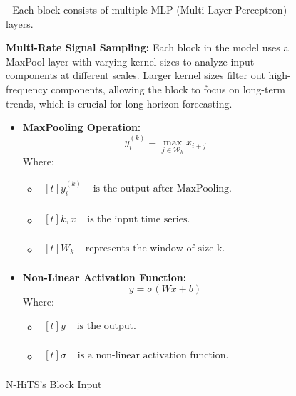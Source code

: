 \documentclass{ieeeojies}
\begin{document}
\begin{figure}[H]
\begin{minipage}{0.15\textwidth}
    \caption{N-HiTS’s Block Input}
    \label{fig:1}
    \end{minipage}
    \begin{minipage}{0.50\textwidth}
    - Each block consists of multiple MLP (Multi-Layer Perceptron) layers. \par
    \textbf{Multi-Rate Signal Sampling:} Each block in the model uses a MaxPool layer with varying kernel sizes to analyze input components at different scales. Larger kernel sizes filter out high-frequency components, allowing the block to focus on long-term trends, which is crucial for long-horizon forecasting.
\begin{itemize}
    \item  \textbf{MaxPooling Operation:} 
\[
y_i^{(k)} = \max_{j \in \mathcal{W}_k} x_{i+j}
\]
Where:
\begin{itemize}
    \item $\begin{aligned}[t]
            y_i^{(k)} & \text{ is the output after MaxPooling.} \\
            \end{aligned}$
    \item $\begin{aligned}[t]
            k, x & \text{ is the input time series.} \\
            \end{aligned}$
    \item $\begin{aligned}[t]
            {W}_k & \text{ represents the window of size k.} \\
            \end{aligned}$
\end{itemize}
\end{itemize}
\begin{itemize}
    \item  \textbf{Non-Linear Activation Function:} 
\[
y = \sigma(Wx + b)
\]
Where: 
\begin{itemize}
    \item $\begin{aligned}[t]
            y & \text{ is the output.} \\
            \end{aligned}$
    \item $\begin{aligned}[t]
            \sigma & \text{ is a non-linear activation function.} \\
            \end{aligned}$

\end{itemize}
\end{itemize}
\end{minipage}
\end{figure}
\end{document}
